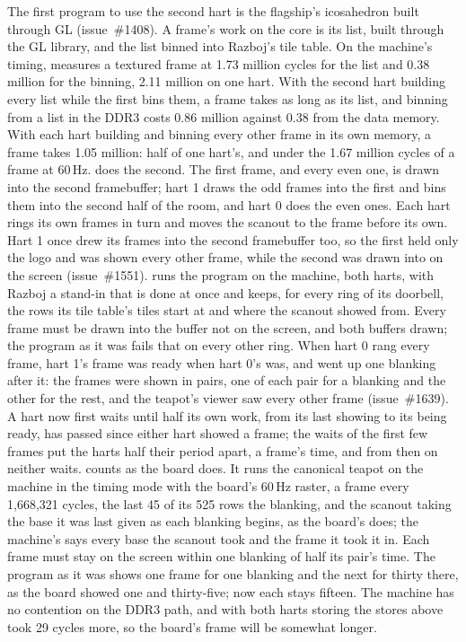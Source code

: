 \documentclass[journal,onecolumn,9pt]{IEEEtran}
\begin{document}
The first program to use the second hart is the flagship's
icosahedron built through GL (issue~\#1408). A frame's work on the
core is its list, built through the GL library, and the list binned
into Razboj's tile table. On the machine's timing, 
measures a textured frame at 1.73 million cycles for the list and 0.38
million for the binning, 2.11 million on one hart. With the second
hart building every list while the first bins them, a frame takes as
long as its list, and binning from a list in the DDR3 costs 0.86
million against 0.38 from the data memory. With each hart building
and binning every other frame in its own memory, a frame takes 1.05
million: half of one hart's, and under the 1.67 million cycles of a
frame at 60\,Hz.  does the second. The first frame, and every even one, is drawn into
the second framebuffer; hart 1 draws the odd frames into the first and
bins them into the second half of the room, and hart 0 does the even
ones. Each hart rings its own frames in turn and moves the scanout to
the frame before its own. Hart
1 once drew its frames into the second framebuffer too, so the first
held only the logo and was shown every other frame, while the second
was drawn into on the screen (issue~\#1551).
 runs the program on the machine, both harts,
with Razboj a stand-in that is done at once and keeps, for every ring
of its doorbell, the rows its tile table's tiles start at and where
the scanout showed from. Every frame must be drawn into the buffer not
on the screen, and both buffers drawn; the program as it was fails
that on every other ring.
When hart 0 rang every frame, hart 1's frame was ready when hart 0's
was, and went up one blanking after it: the frames were shown in
pairs, one of each pair for a blanking and the other for the rest,
and the teapot's viewer saw every other frame (issue~\#1639). A hart
now first waits until half its own work, from its last showing to its
being ready, has passed since either hart showed a frame; the waits
of the first few frames put the harts half their period apart, a
frame's time, and from then on neither waits.
 counts as the board does. It runs the
canonical teapot on the machine in the timing mode with the board's
60\,Hz raster, a frame every 1{,}668{,}321 cycles, the last 45 of its
525 rows the blanking, and the scanout taking the base it was last
given as each blanking begins, as the board's does; the machine's
 says every base the scanout took and the frame it took
it in. Each frame must stay on the screen within one blanking of half
its pair's time. The program as it was shows one frame for one
blanking and the next for thirty there, as the board showed one and
thirty-five; now each stays fifteen. The machine has no contention on
the DDR3 path, and with both harts storing the stores above took 29
cycles more, so the board's frame will be somewhat longer.
\end{document}
